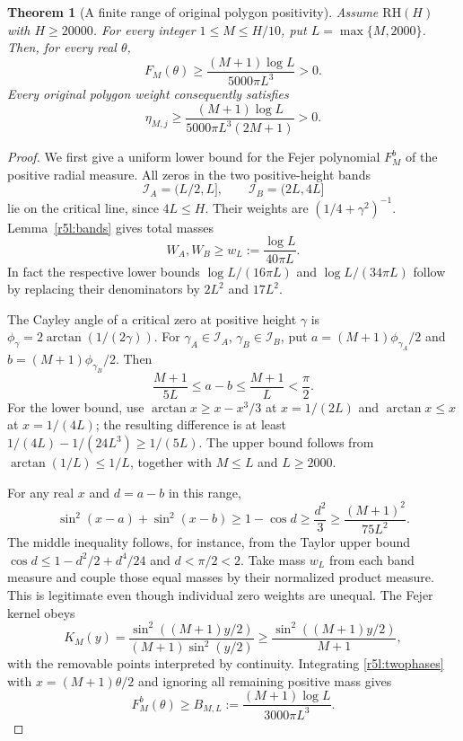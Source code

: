 \documentclass[11pt,a4paper]{article}
\newtheorem{theorem}{Theorem}[section]
\theoremstyle{definition}\newtheorem{definition}[theorem]{Definition}
\theoremstyle{remark}\newtheorem{remark}[theorem]{Remark}
\numberwithin{equation}{section}
\begin{document}
\begin{theorem}[A finite range of original polygon positivity]
\label{r5l:finitepositive}
Assume $\mathrm{RH}(H)$ with $H\ge20000$.  For every integer
$1\le M\le H/10$, put $L=\max\{M,2000\}$.  Then, for every
real $\theta$,
\begin{equation}\label{r5l:finitepositivemargin}
 F_M(\theta)\ge\frac{(M+1)\log L}{5000\pi L^3}>0.
\end{equation}
Every original polygon weight consequently satisfies
\begin{equation}\label{r5l:finitepositiveeta}
 \eta_{M,j}\ge
 \frac{(M+1)\log L}{5000\pi L^3(2M+1)}>0.
\end{equation}
\end{theorem}
\begin{proof}
We first give a uniform lower bound for the Fejer polynomial
$F_M^b$ of the positive radial measure.  All zeros in the two
positive-height bands
\[
 \mathcal I_A=(L/2,L],\qquad \mathcal I_B=(2L,4L]
\]
lie on the critical line, since $4L\le H$.  Their weights are
$(1/4+\gamma^2)^{-1}$.  Lemma~\ref{r5l:bands} gives total masses
\begin{equation}\label{r5l:bandmass}
 W_A,W_B\ge w_L:=\frac{\log L}{40\pi L}.
\end{equation}
In fact the respective lower bounds $\log L/(16\pi L)$ and
$\log L/(34\pi L)$ follow by replacing their denominators by
$2L^2$ and $17L^2$.

The Cayley angle of a critical zero at positive height $\gamma$ is
$\phi_\gamma=2\arctan(1/(2\gamma))$.  For
$\gamma_A\in\mathcal I_A$, $\gamma_B\in\mathcal I_B$, put
$a=(M+1)\phi_{\gamma_A}/2$ and
$b=(M+1)\phi_{\gamma_B}/2$.  Then
\begin{equation}\label{r5l:angularseparation}
 \frac{M+1}{5L}\le a-b\le\frac{M+1}{L}<\frac\pi2.
\end{equation}
For the lower bound, use
$\arctan x\ge x-x^3/3$ at $x=1/(2L)$ and
$\arctan x\le x$ at $x=1/(4L)$; the resulting difference is
at least $1/(4L)-1/(24L^3)\ge1/(5L)$.
The upper bound follows from $\arctan(1/L)\le1/L$, together with
$M\le L$ and $L\ge2000$.

For any real $x$ and $d=a-b$ in this range,
\begin{equation}\label{r5l:twophases}
 \sin^2(x-a)+\sin^2(x-b)
 \ge1-\cos d\ge\frac{d^2}{3}
 \ge\frac{(M+1)^2}{75L^2}.
\end{equation}
The middle inequality follows, for instance, from the Taylor
upper bound $\cos d\le1-d^2/2+d^4/24$ and $d<\pi/2<2$.
Take mass $w_L$ from each band measure and couple those equal masses
by their normalized product measure.  This is legitimate even
though individual zero weights are unequal.  The Fejer kernel obeys
\[
 K_M(y)=\frac{\sin^2((M+1)y/2)}{(M+1)\sin^2(y/2)}
 \ge\frac{\sin^2((M+1)y/2)}{M+1},
\]
with the removable points interpreted by continuity.  Integrating
\eqref{r5l:twophases} with $x=(M+1)\theta/2$ and ignoring all
remaining positive mass gives
\begin{equation}\label{r5l:radialfejerlower}
 F_M^b(\theta)\ge
 B_{M,L}:=\frac{(M+1)\log L}{3000\pi L^3}.
\end{equation}


\end{proof}
\end{document}
